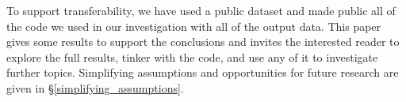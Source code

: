 To support transferability, we have used a public dataset and made public all of the code we used in our investigation with all of the output data.  This paper gives some results to support the conclusions and invites the interested reader to explore the full results, tinker with the code, and use any of it to investigate further topics.  Simplifying assumptions and opportunities for future research are given in \S \ref{simplifying_assumptions}.







